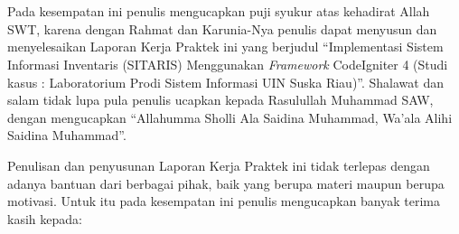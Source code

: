 %



\chapter*{\kataPengantar}
Pada kesempatan ini penulis mengucapkan puji syukur atas kehadirat Allah SWT, karena dengan Rahmat dan Karunia-Nya penulis dapat menyusun dan menyelesaikan Laporan Kerja Praktek ini yang berjudul “Implementasi Sistem Informasi Inventaris (SITARIS) Menggunakan \textit{Framework} CodeIgniter 4 (Studi kasus : Laboratorium Prodi Sistem Informasi UIN Suska Riau)”. Shalawat dan salam tidak lupa pula penulis ucapkan kepada Rasulullah Muhammad SAW, dengan mengucapkan “Allahumma Sholli Ala Saidina Muhammad, Wa’ala Alihi Saidina Muhammad”.

Penulisan dan penyusunan Laporan Kerja Praktek ini tidak terlepas dengan adanya bantuan dari berbagai pihak, baik yang berupa materi maupun berupa motivasi. Untuk itu pada kesempatan ini penulis mengucapkan banyak terima kasih kepada:

